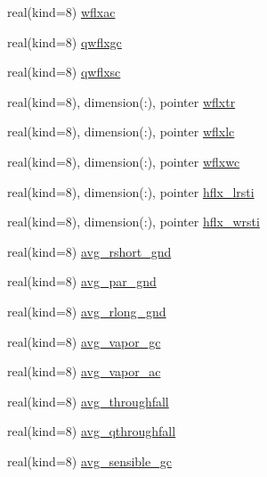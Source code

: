 \begin{DoxyCompactItemize}
\item 
real(kind=8) \hyperlink{structrk4__coms_1_1rk4patchtype_a855ac3dcf0079191e7d703bce3eda4ac}{wflxac}
\item 
real(kind=8) \hyperlink{structrk4__coms_1_1rk4patchtype_a33b2c77dd0ec791ff234f4c857e95f4e}{qwflxgc}
\item 
real(kind=8) \hyperlink{structrk4__coms_1_1rk4patchtype_a0b1242784c4233b43ef62bffd77f389f}{qwflxsc}
\item 
real(kind=8), dimension(\+:), pointer \hyperlink{structrk4__coms_1_1rk4patchtype_a39d31da536af793526e0d78c55497e53}{wflxtr}
\item 
real(kind=8), dimension(\+:), pointer \hyperlink{structrk4__coms_1_1rk4patchtype_a3cc9820eadba700ee8fd10f60bcb9793}{wflxlc}
\item 
real(kind=8), dimension(\+:), pointer \hyperlink{structrk4__coms_1_1rk4patchtype_abcd8442c37566eb8cfcd62126443733c}{wflxwc}
\item 
real(kind=8), dimension(\+:), pointer \hyperlink{structrk4__coms_1_1rk4patchtype_ac1cd7c1b3715135e46134beb55db70a6}{hflx\+\_\+lrsti}
\item 
real(kind=8), dimension(\+:), pointer \hyperlink{structrk4__coms_1_1rk4patchtype_ab34cdedd16b0d2956ebc9e9693186fb2}{hflx\+\_\+wrsti}
\item 
real(kind=8) \hyperlink{structrk4__coms_1_1rk4patchtype_aacd61fb6f611767f18727c780d81351f}{avg\+\_\+rshort\+\_\+gnd}
\item 
real(kind=8) \hyperlink{structrk4__coms_1_1rk4patchtype_ad045b46c02be25c3aa3e0e49c24ac50d}{avg\+\_\+par\+\_\+gnd}
\item 
real(kind=8) \hyperlink{structrk4__coms_1_1rk4patchtype_ad2e1e81c113f2cb0eac3ae982e1249cb}{avg\+\_\+rlong\+\_\+gnd}
\item 
real(kind=8) \hyperlink{structrk4__coms_1_1rk4patchtype_af1544e566b39e6b6e206fc22e90a8b29}{avg\+\_\+vapor\+\_\+gc}
\item 
real(kind=8) \hyperlink{structrk4__coms_1_1rk4patchtype_ae9cc8f64054b117016632558076bc86b}{avg\+\_\+vapor\+\_\+ac}
\item 
real(kind=8) \hyperlink{structrk4__coms_1_1rk4patchtype_a0ec74d80afb3b2cd79ab7f574e63b9e2}{avg\+\_\+throughfall}
\item 
real(kind=8) \hyperlink{structrk4__coms_1_1rk4patchtype_a5c991b2499c0df1b6422452a7a32be42}{avg\+\_\+qthroughfall}
\item 
real(kind=8) \hyperlink{structrk4__coms_1_1rk4patchtype_ad03234b8be00be846f8b3ed7f9829d0f}{avg\+\_\+sensible\+\_\+gc}

\end{DoxyCompactItemize}
